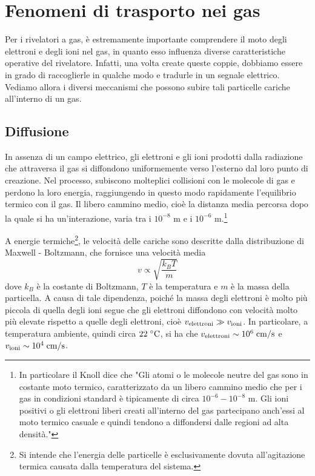 \section{Fenomeni di trasporto nei gas}

Per i rivelatori a gas, è estremamente importante comprendere il moto degli elettroni e degli ioni nel gas, in quanto esso influenza diverse caratteristiche operative del rivelatore. Infatti, una volta create queste coppie, dobbiamo essere in grado di raccoglierle in qualche modo e tradurle in un segnale elettrico. Vediamo allora i diversi meccanismi che possono subire tali particelle cariche all'interno di un gas.

\subsection{Diffusione}

In assenza di un campo elettrico, gli elettroni e gli ioni prodotti dalla radiazione che attraversa il gas si diffondono uniformemente verso l'esterno dal loro punto di creazione. Nel processo, subiscono molteplici collisioni con le molecole di gas e perdono la loro energia, raggiungendo in questo modo rapidamente l'equilibrio termico con il gas. Il libero cammino medio, cioè la distanza media percorsa dopo la quale si ha un'interazione, varia tra i $10^{-8}$ m e i $10^{-6}$ m.\footnote{In particolare il Knoll dice che "Gli atomi o le molecole neutre del gas sono in costante moto termico, caratterizzato da un libero cammino medio che per i gas in condizioni standard è tipicamente di circa $10^{-6} - 10^{-8}$ m. Gli ioni positivi o gli elettroni liberi creati all'interno del gas partecipano anch'essi al moto termico casuale e quindi tendono a diffondersi dalle regioni ad alta densità."}

A energie termiche\footnote{Si intende che l'energia delle particelle è esclusivamente dovuta all'agitazione termica causata dalla temperatura del sistema.}, le velocità delle cariche sono descritte dalla distribuzione di Maxwell - Boltzmann, che fornisce una velocità media 
\begin{equation*}
   v \propto \sqrt{\frac{k_B T}{m}}
\end{equation*}
dove $k_B$ è la costante di Boltzmann, $T$ è la temperatura e $m$ è la massa della particella. A causa di tale dipendenza, poiché la massa degli elettroni è molto più piccola di quella degli ioni segue che gli elettroni diffondono con velocità molto più elevate rispetto a quelle degli elettroni, cioè $v_{\rm elettroni} \gg v_{\rm ioni}$. In particolare, a temperatura ambiente, quindi circa $22 \rm \; ^{\circ}C$, si ha che $v_{\rm elettroni} \sim 10^6 \; \rm cm/s$ e $v_{\rm ioni} \sim 10^4 \; \rm cm/s$.

